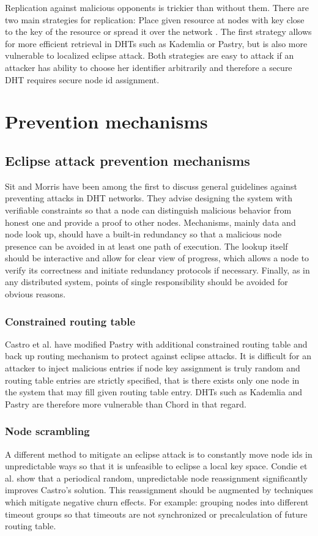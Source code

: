   Replication against malicious opponents is trickier than without them. There
  are two main strategies for replication: Place given resource at nodes with
  key close to the key of the resource or spread it over the network \cite[p.
  38]{urd11}. The first strategy allows for more efficient retrieval in DHTs
  such as Kademlia or Pastry, but is also more vulnerable to localized eclipse
  attack. Both strategies are easy to attack if an attacker has ability to
  choose her identifier arbitrarily and therefore a secure DHT requires secure
  node id assignment.

\section{Prevention mechanisms}
\subsection{Eclipse attack prevention mechanisms}

  Sit and Morris \cite{sit02} have been among the first to discuss general
  guidelines against preventing attacks in DHT networks. They advise designing
  the system with verifiable constraints so that a node can distinguish
  malicious behavior from honest one and provide a proof to other nodes.
  Mechanisms, mainly data and node look up, should have a built-in redundancy so
  that a malicious node presence can be avoided in at least one path of
  execution. The lookup itself should be interactive and allow for clear view of
  progress, which allows a node to verify its correctness and initiate
  redundancy protocols if necessary. Finally, as in any distributed system,
  points of single responsibility should be avoided for obvious reasons.
  
  \subsubsection{Constrained routing table}
  Castro et al. \cite{cas02} have modified Pastry with additional constrained
  routing table and back up routing mechanism to protect against eclipse
  attacks. It is difficult for an attacker to inject malicious entries if node
  key assignment is truly random and routing table entries are strictly
  specified, that is there exists only one node in the system that may fill
  given routing table entry.  DHTs such as Kademlia and Pastry are therefore
  more vulnerable than Chord in that regard.

  \subsubsection{Node scrambling}
  A different method to mitigate an eclipse attack is to constantly move node
  ids in unpredictable ways so that it is unfeasible to eclipse a local
  key space. Condie et al. \cite{con06} show that a periodical random,
  unpredictable node reassignment significantly improves Castro's solution.
  This reassignment should be augmented by techniques which mitigate negative
  churn effects. For example: grouping nodes into different timeout groups so
  that timeouts are not synchronized or precalculation of future routing table.

